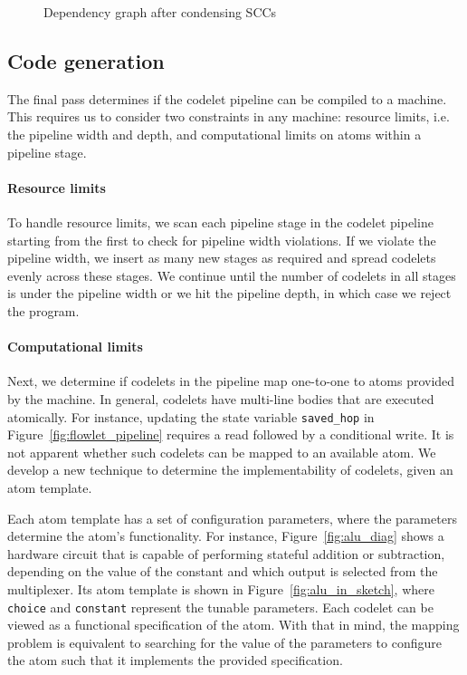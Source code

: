 \begin{figure}[!t]
\begin{minipage}{0.5\textwidth}
\caption{Dependency graph after condensing SCCs }
\label{fig:partitioning_after}
\end{minipage}
\end{figure}

\subsection{Code generation}
\label{ss:code_gen}

The final pass determines if the codelet pipeline can be compiled to a
\absmachine machine.  This requires us to consider two constraints in
any \absmachine machine: resource limits, i.e. the pipeline width and
depth, and computational limits on atoms within a pipeline stage.

\paragraph{Resource limits}
To handle resource limits, we scan each pipeline stage in the codelet pipeline
starting from the first to check for pipeline width violations.  If we violate
the pipeline width, we insert as many new stages as required and spread
codelets evenly across these stages.  We continue until the number of codelets
in all stages is under the pipeline width or we hit the pipeline depth, in
which case we reject the program.

\paragraph{Computational limits}
Next, we determine if codelets in the pipeline map one-to-one to atoms
provided by the \absmachine machine. In general, codelets have
multi-line bodies that are executed atomically. For instance, updating
the state variable \texttt{saved\_hop} in
Figure~\ref{fig:flowlet_pipeline} 
requires a read followed by a conditional write.  It is not apparent
whether such codelets can be mapped to an available atom. We develop a
new technique to determine the implementability of codelets, given an
atom template.

Each atom template has a set of configuration parameters, where the parameters
determine the atom's functionality.  For instance, Figure~\ref{fig:alu_diag}
shows a hardware circuit that is capable of performing stateful addition or
subtraction, depending on the value of the constant and which output is
selected from the multiplexer.  Its atom template is shown in
Figure~\ref{fig:alu_in_sketch}, where {\tt choice} and {\tt constant} represent
the tunable parameters.  Each codelet can be viewed as a functional
specification of the atom.  With that in mind, the mapping problem is
equivalent to searching for the value of the parameters to configure the atom
such that it implements the provided specification.

